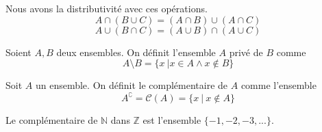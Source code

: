 \begin{remarque} Nous avons la distributivité avec ces opérations.
    \[
A \cap (B \cup C) = (A \cap B) \cup (A \cap C)
\]
\[
A \cup (B \cap C) = (A \cup B) \cap (A \cup C)
\]
\end{remarque}


    \begin{definition}[Soustraction]
        Soient $A,B$ deux ensembles. On définit l'ensemble $A$ privé de $B$ comme
        \[
        A \setminus B=\{x\:| x\in A \wedge x\notin B\}
        \]
    \end{definition}



\begin{center}
\end{center}




    \begin{definition}[Complémentaire]
        Soit $A$ un ensemble. On définit le complémentaire de $A$ comme l'ensemble
        \[
        A^{\complement}=\mathcal{C}(A)=\{x\: |\: x\notin A\}
        \]
    \end{definition}

\begin{exemple}
    Le complémentaire de $\mathbb{N}$ dans $\mathbb{Z}$ est l'ensemble $\{-1,-2,-3,...\}$.
\end{exemple}

